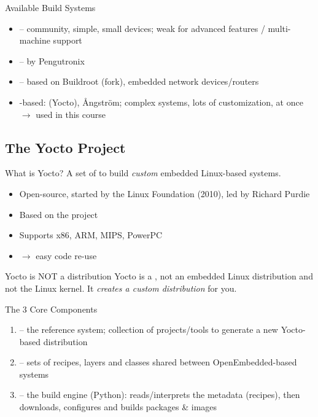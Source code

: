 \begin{definition}{Available Build Systems}
    \begin{itemize}
        \item {} -- community, simple, small devices; weak for advanced
              features / multi-machine support
        \item {} -- by Pengutronix
        \item {} -- based on Buildroot (fork), embedded network devices/routers
        \item {}-based:  (Yocto), Ångström; complex systems, lots of customization,
         at once $\rightarrow$ used in this course
    \end{itemize}
\end{definition}


\subsection{The Yocto Project}

\begin{concept}{What is Yocto?}
    A set of  to build \emph{custom}
    embedded Linux-based systems.
    \begin{itemize}
        \item Open-source, started by the Linux Foundation (2010), led by
              Richard Purdie
        \item Based on the  project
        \item Supports x86, ARM, MIPS, PowerPC
        \item {} $\rightarrow$ easy code re-use
    \end{itemize}
\end{concept}

\begin{corollary}{Yocto is NOT a distribution}
    Yocto is a , not an embedded Linux distribution and
    not the Linux kernel. It \emph{creates a custom distribution} for you.
\end{corollary}


\begin{theorem}{The 3 Core Components}
    \begin{enumerate}
        \item {} -- the reference system; collection of projects/tools
              to generate a new Yocto-based distribution
        \item {} -- sets of recipes, layers and classes
              shared between OpenEmbedded-based systems
        \item {} -- the build engine (Python): reads/interprets
              the metadata (recipes), then downloads, configures and builds
              packages \& images
    \end{enumerate}
\end{theorem}

